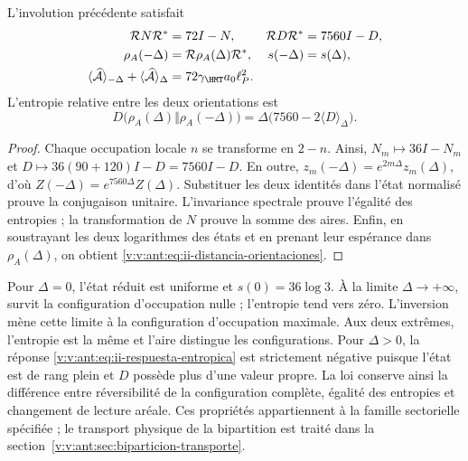 \begin{theorem}
L'involution précédente satisfait
\begin{align}
 \mathcal R N\mathcal R^*&=72I-N,&
 \mathcal R D\mathcal R^*&=7560I-D,\\
 \rho_A(-\Delta)&=\mathcal R\rho_A(\Delta)\mathcal R^*,&
 s(-\Delta)&=s(\Delta),
 \label{v:v:ant:eq:ii-inversion-entropia}\\
 \langle\widehat{\mathcal A}\rangle_{-\Delta}
 +\langle\widehat{\mathcal A}\rangle_\Delta
 &=72\gamma_{\HMT}a_0\ell_P^2.&&
 \label{v:v:ant:eq:ii-area-complementaria}
\end{align}
L'entropie relative entre les deux orientations est
\begin{equation}
 D\bigl(\rho_A(\Delta)\Vert\rho_A(-\Delta)\bigr)
 =\Delta\bigl(7560-2\langle D\rangle_\Delta\bigr).
 \label{v:v:ant:eq:ii-distancia-orientaciones}
\end{equation}
\end{theorem}
\begin{proof}
Chaque occupation locale $n$ se transforme en $2-n$. Ainsi,
$N_m\mapsto36I-N_m$ et
$D\mapsto36(90+120)I-D=7560I-D$.
En outre, $z_m(-\Delta)=e^{2m\Delta}z_m(\Delta)$,
d'où $Z(-\Delta)=e^{7560\Delta}Z(\Delta)$.
Substituer les deux identités dans l'état normalisé prouve la
conjugaison unitaire. L'invariance spectrale prouve l'égalité
des entropies ; la transformation de $N$ prouve la somme des aires.
Enfin, en soustrayant les deux logarithmes des états et en prenant
leur espérance dans $\rho_A(\Delta)$, on obtient
\eqref{v:v:ant:eq:ii-distancia-orientaciones}.
\end{proof}

Pour $\Delta=0$, l'état réduit est uniforme et
$s(0)=36\log3$. À la limite $\Delta\to+\infty$, survit
la configuration d'occupation nulle ; l'entropie tend vers zéro.
L'inversion mène cette limite à la configuration d'occupation maximale.
Aux deux extrêmes, l'entropie est la même et l'aire distingue les
configurations. Pour $\Delta>0$, la réponse
\eqref{v:v:ant:eq:ii-respuesta-entropica} est strictement négative puisque
l'état est de rang plein et $D$ possède plus d'une valeur propre.
La loi conserve ainsi la différence entre réversibilité de la
configuration complète, égalité des entropies et changement de lecture aréale.
Ces propriétés appartiennent à la famille sectorielle spécifiée ;
le transport physique de la bipartition est traité dans
la section~\ref{v:v:ant:sec:biparticion-transporte}.

